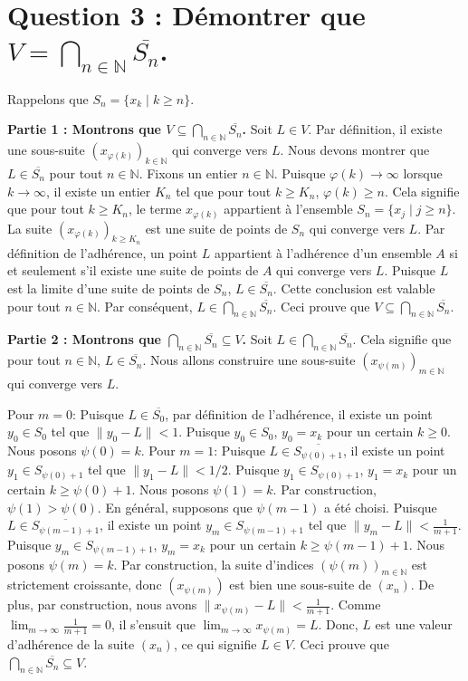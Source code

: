 \documentclass{report}
\begin{document}
\section*{Question 3 : Démontrer que $V = \bigcap_{n \in \mathbb{N}} \overline{S_n}$.}

Rappelons que $S_n = \{x_k \mid k \ge n\}$.

\textbf{Partie 1 : Montrons que $V \subseteq \bigcap_{n \in \mathbb{N}} \overline{S_n}$.}
Soit $L \in V$. Par définition, il existe une sous-suite $(x_{\varphi(k)})_{k \in \mathbb{N}}$ qui converge vers $L$.
Nous devons montrer que $L \in \overline{S_n}$ pour tout $n \in \mathbb{N}$.
Fixons un entier $n \in \mathbb{N}$. Puisque $\varphi(k) \to \infty$ lorsque $k \to \infty$, il existe un entier $K_n$ tel que pour tout $k \ge K_n$, $\varphi(k) \ge n$.
Cela signifie que pour tout $k \ge K_n$, le terme $x_{\varphi(k)}$ appartient à l'ensemble $S_n = \{x_j \mid j \ge n\}$.
La suite $(x_{\varphi(k)})_{k \ge K_n}$ est une suite de points de $S_n$ qui converge vers $L$.
Par définition de l'adhérence, un point $L$ appartient à l'adhérence d'un ensemble $A$ si et seulement s'il existe une suite de points de $A$ qui converge vers $L$.
Puisque $L$ est la limite d'une suite de points de $S_n$, $L \in \overline{S_n}$.
Cette conclusion est valable pour tout $n \in \mathbb{N}$.
Par conséquent, $L \in \bigcap_{n \in \mathbb{N}} \overline{S_n}$.
Ceci prouve que $V \subseteq \bigcap_{n \in \mathbb{N}} \overline{S_n}$.

\textbf{Partie 2 : Montrons que $\bigcap_{n \in \mathbb{N}} \overline{S_n} \subseteq V$.}
Soit $L \in \bigcap_{n \in \mathbb{N}} \overline{S_n}$. Cela signifie que pour tout $n \in \mathbb{N}$, $L \in \overline{S_n}$.
Nous allons construire une sous-suite $(x_{\psi(m)})_{m \in \mathbb{N}}$ qui converge vers $L$.

Pour $m=0$: Puisque $L \in \overline{S_0}$, par définition de l'adhérence, il existe un point $y_0 \in S_0$ tel que $\|y_0 - L\| < 1$. Puisque $y_0 \in S_0$, $y_0 = x_k$ pour un certain $k \ge 0$. Nous posons $\psi(0) = k$.
Pour $m=1$: Puisque $L \in \overline{S_{\psi(0)+1}}$, il existe un point $y_1 \in S_{\psi(0)+1}$ tel que $\|y_1 - L\| < 1/2$. Puisque $y_1 \in S_{\psi(0)+1}$, $y_1 = x_k$ pour un certain $k \ge \psi(0)+1$. Nous posons $\psi(1) = k$. Par construction, $\psi(1) > \psi(0)$.
En général, supposons que $\psi(m-1)$ a été choisi. Puisque $L \in \overline{S_{\psi(m-1)+1}}$, il existe un point $y_m \in S_{\psi(m-1)+1}$ tel que $\|y_m - L\| < \frac{1}{m+1}$. Puisque $y_m \in S_{\psi(m-1)+1}$, $y_m = x_k$ pour un certain $k \ge \psi(m-1)+1$. Nous posons $\psi(m) = k$.
Par construction, la suite d'indices $(\psi(m))_{m \in \mathbb{N}}$ est strictement croissante, donc $(x_{\psi(m)})$ est bien une sous-suite de $(x_n)$.
De plus, par construction, nous avons $\|x_{\psi(m)} - L\| < \frac{1}{m+1}$.
Comme $\lim_{m \to \infty} \frac{1}{m+1} = 0$, il s'ensuit que $\lim_{m \to \infty} x_{\psi(m)} = L$.
Donc, $L$ est une valeur d'adhérence de la suite $(x_n)$, ce qui signifie $L \in V$.
Ceci prouve que $\bigcap_{n \in \mathbb{N}} \overline{S_n} \subseteq V$.
\end{document}
